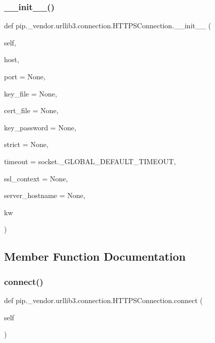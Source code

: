 \subsubsection{\texorpdfstring{\+\_\+\+\_\+init\+\_\+\+\_\+()}{\_\_init\_\_()}}
{\footnotesize\ttfamily def pip.\+\_\+vendor.\+urllib3.\+connection.\+H\+T\+T\+P\+S\+Connection.\+\_\+\+\_\+init\+\_\+\+\_\+ (\begin{DoxyParamCaption}\item[{}]{self,  }\item[{}]{host,  }\item[{}]{port = {\ttfamily None},  }\item[{}]{key\+\_\+file = {\ttfamily None},  }\item[{}]{cert\+\_\+file = {\ttfamily None},  }\item[{}]{key\+\_\+password = {\ttfamily None},  }\item[{}]{strict = {\ttfamily None},  }\item[{}]{timeout = {\ttfamily socket.\+\_\+GLOBAL\+\_\+DEFAULT\+\_\+TIMEOUT},  }\item[{}]{ssl\+\_\+context = {\ttfamily None},  }\item[{}]{server\+\_\+hostname = {\ttfamily None},  }\item[{}]{kw }\end{DoxyParamCaption})}



\subsection{Member Function Documentation}
\mbox{\label{classpip_1_1__vendor_1_1urllib3_1_1connection_1_1HTTPSConnection_a1fb7066192211cdea75a0322341c46a3}} 
\subsubsection{\texorpdfstring{connect()}{connect()}}
{\footnotesize\ttfamily def pip.\+\_\+vendor.\+urllib3.\+connection.\+H\+T\+T\+P\+S\+Connection.\+connect (\begin{DoxyParamCaption}\item[{}]{self }\end{DoxyParamCaption})}

